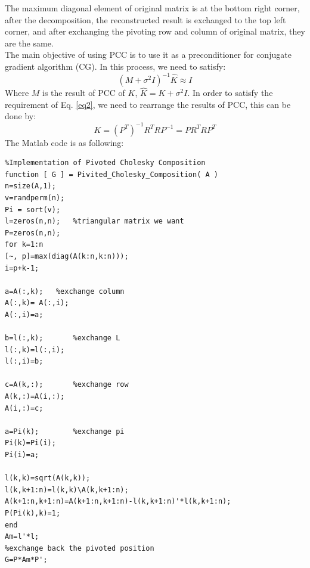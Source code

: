 \documentclass{article} %
\begin{document}
The maximum diagonal element of original matrix is at the bottom right corner, after the decomposition, the reconstructed result is exchanged to the top left corner, and after exchanging the pivoting row and column of original matrix, they are the same.\\
The main objective of using PCC is to use it as a preconditioner for conjugate gradient algorithm (CG). In this process, we need to satisfy:
\begin{equation}\label{eq2}
(M+\sigma ^2I)^{-1}\hat{K}\approx I
\end{equation}
Where $M$ is the result of PCC of $K$, $\hat{K}=K+\sigma ^2I$. In order to satisfy the requirement of Eq. \ref{eq2}, we need to rearrange the results of PCC, this can be done by:
\begin{equation}
K=(P^T)^{-1}R^TRP^{-1}=PR^TRP^T
\end{equation}
The Matlab code is as following:
\begin{lstlisting}
%Implementation of Pivoted Cholesky Composition
function [ G ] = Pivited_Cholesky_Composition( A )
n=size(A,1);
v=randperm(n);
Pi = sort(v);
l=zeros(n,n);   %triangular matrix we want 
P=zeros(n,n);
for k=1:n
[~, p]=max(diag(A(k:n,k:n)));
i=p+k-1;

a=A(:,k);   %exchange column
A(:,k)= A(:,i);
A(:,i)=a;

b=l(:,k);       %exchange L
l(:,k)=l(:,i);
l(:,i)=b;

c=A(k,:);       %exchange row
A(k,:)=A(i,:);
A(i,:)=c;

a=Pi(k);        %exchange pi
Pi(k)=Pi(i);
Pi(i)=a;

l(k,k)=sqrt(A(k,k));
l(k,k+1:n)=l(k,k)\A(k,k+1:n);
A(k+1:n,k+1:n)=A(k+1:n,k+1:n)-l(k,k+1:n)'*l(k,k+1:n);
P(Pi(k),k)=1;
end
Am=l'*l;
%exchange back the pivoted position
G=P*Am*P';
\end{lstlisting}
\end{document}
